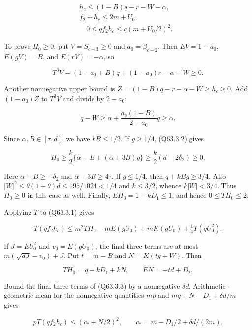 \[
\begin{gathered}
h_c\le(1-B)q-r-W-\alpha,\quad\\
f_2+h_c\le2m+U_0,\\
\quad 0\le qf_2h_c\le q(m+U_0/2)^2.
\end{gathered}\tag{Q63.3.1}\label{eq:Q63:Q63:3:1}
\]

To prove $H_0\ge\allowbreak 0$, put $V=\allowbreak S_{c-3}\ge\allowbreak 0$ and $a_0=\allowbreak \beta_{c-2}$.
Then $EV=\allowbreak 1-a_0$, $E(gV)=\allowbreak B$, and $E(rV)=\allowbreak -\alpha$, so

\[
T^3V=(1-a_0+B)q+(1-a_0)r-\alpha-W\ge0.
\]

Another nonnegative upper bound is $Z=\allowbreak (1-B)q-r-\alpha-W\ge\allowbreak  h_c\ge\allowbreak 0$.
Add $(1-a_0)Z$ to $T^3V$ and divide by $2-a_0$:

\[
q-W\ge\alpha+\frac{a_0(1-B)}{2-a_0}q\ge\alpha.
\tag{Q63.3.2}\label{eq:Q63:Q63:3:2}
\]

Since $\alpha,\allowbreak  B\in[\tau,\allowbreak  d]$, we have $kB\le\allowbreak 1/2$. If $g\ge\allowbreak 1/4$, (Q63.3.2) gives

\[
H_0\ge\frac{k}{2}\{\alpha-B+(\alpha+3B)g\}
\ge\frac{k}{2}(d-2\delta_2)\ge0.
\]

Here $\alpha-B\ge\allowbreak -\delta_2$ and $\alpha+3B\ge\allowbreak 4\tau$. If $g\le\allowbreak 1/4$, then $q+kBg\ge\allowbreak 3/4$.
Also $|W|^2\le\allowbreak \theta(1+\theta)d\le\allowbreak 195/1024<\allowbreak 1/4$ and $k\le\allowbreak 3/2$, whence $k|W|<\allowbreak 3/4$.
Thus $H_0\ge\allowbreak 0$ in this case as well. Finally, $EH_0=\allowbreak 1-kD_1\le\allowbreak 1$, and hence $0\le\allowbreak  TH_0\le\allowbreak 2$.


Applying $T$ to (Q63.3.1) gives

\[
T(qf_2h_c)\le m^2TH_0-mE(gU_0)+mK(gU_0)+\tfrac14T(qU_0^2).
\tag{Q63.3.3}\label{eq:Q63:Q63:3:3}
\]

If $J=\allowbreak EU_0^2$ and $v_0=\allowbreak E(gU_0)$, the final three terms are at most $m(\sqrt{dJ}-v_0)+J$.
Put $t=\allowbreak m-B$ and $N=\allowbreak K(tg+W)$. Then

\[
TH_0=q-kD_1+kN,\qquad EN=-td+D_2.
\tag{Q63.3.4}\label{eq:Q63:Q63:3:4}
\]

Bound the final three terms of (Q63.3.3) by a nonnegative $\delta d$. Arithmetic--geometric mean for the nonnegative quantities $mp$ and
$mq+N-D_1+\delta d/m$ gives

\[
pT(qf_2h_c)\le(c_*+N/2)^2,
\qquad c_*=m-D_1/2+\delta d/(2m).
\tag{Q63.3.5}\label{eq:Q63:Q63:3:5}
\]


